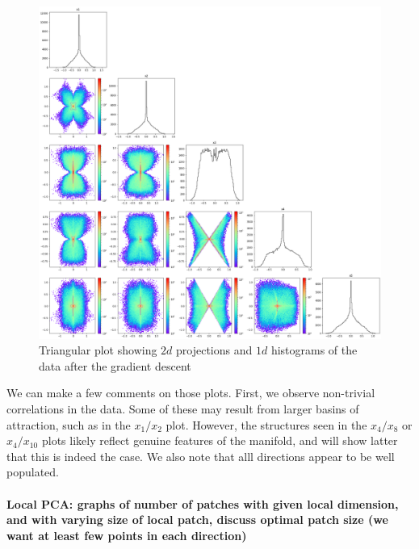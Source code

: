 \documentclass[11pt]{article}
\begin{document}
		\begin{figure}[t]
			\centering
			\includegraphics[scale = 0.25]{Figures/triangular_plot_1_2_4_8_10.png} %
			\caption{Triangular plot showing $2d$ projections and $1d$ histograms of the data after the gradient descent}
			\label{triangular_plot_1_2_4_8_10}
		\end{figure}
		
		We can make a few comments on those plots. First, we observe non-trivial correlations in the data. Some of these may result from larger basins of attraction, such as in the $x_1/x_2$ plot. However, the structures seen in the $x_4/x_8$ or $x_4/x_{10}$ plots likely reflect genuine features of the manifold, and will show latter that this is indeed the case. We also note that alll directions appear to be well populated. 

		\paragraph{Local PCA: graphs of number of patches with given local dimension, and with varying size of local patch, discuss optimal patch size (we want at least few points in each direction)}
\end{document}

